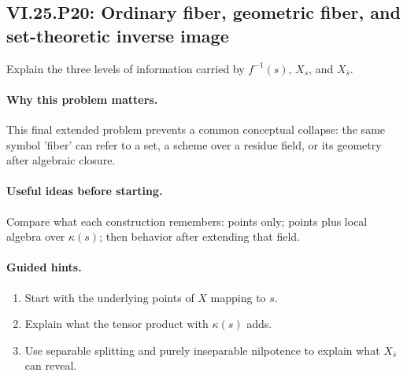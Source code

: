 \subsection*{VI.25.P20: Ordinary fiber, geometric fiber, and set-theoretic inverse image}
\begin{problem}\label{prob:vi25-p20}
Explain the three levels of information carried by \(f^{-1}(s)\), \(X_s\), and \(X_{\bar s}\).
\end{problem}

\ifdefined\FullProblemDossiers
\paragraph{Why this problem matters.}
This final extended problem prevents a common conceptual collapse: the same symbol 'fiber' can refer to a set, a scheme over a residue field, or its geometry after algebraic closure.

\paragraph{Useful ideas before starting.}
Compare what each construction remembers: points only; points plus local algebra over \(\kappa(s)\); then behavior after extending that field.

\paragraph{Guided hints.}
\begin{enumerate}
\item Start with the underlying points of \(X\) mapping to \(s\).
\item Explain what the tensor product with \(\kappa(s)\) adds.
\item Use separable splitting and purely inseparable nilpotence to explain what \(X_{\bar s}\) can reveal.
\end{enumerate}

